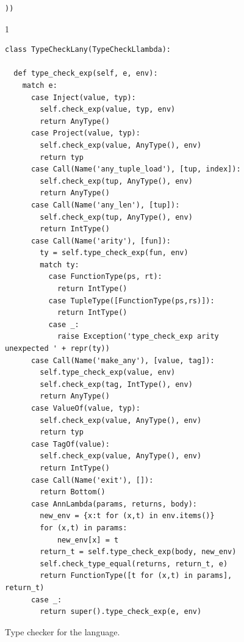 \documentclass[7x10,nocrop]{TimesAPriori_MIT}%
\def\pythonEd{1}
\def\edition{0}
\begin{document}
\begin{figure}[btp]
{\begin{lstlisting}[basicstyle=\ttfamily\small]
))
\end{lstlisting}
\fi}
{\if\edition\pythonEd
\begin{lstlisting}
class TypeCheckLany(TypeCheckLlambda):

  def type_check_exp(self, e, env):
    match e:
      case Inject(value, typ):
        self.check_exp(value, typ, env)
        return AnyType()
      case Project(value, typ):
        self.check_exp(value, AnyType(), env)
        return typ
      case Call(Name('any_tuple_load'), [tup, index]):
        self.check_exp(tup, AnyType(), env)
        return AnyType()
      case Call(Name('any_len'), [tup]):
        self.check_exp(tup, AnyType(), env)
        return IntType()
      case Call(Name('arity'), [fun]):
        ty = self.type_check_exp(fun, env)
        match ty:
          case FunctionType(ps, rt):
            return IntType()
          case TupleType([FunctionType(ps,rs)]):
            return IntType()
          case _:
            raise Exception('type_check_exp arity unexpected ' + repr(ty))
      case Call(Name('make_any'), [value, tag]):
        self.type_check_exp(value, env)
        self.check_exp(tag, IntType(), env)
        return AnyType()
      case ValueOf(value, typ):
        self.check_exp(value, AnyType(), env)
        return typ
      case TagOf(value):
        self.check_exp(value, AnyType(), env)
        return IntType()
      case Call(Name('exit'), []):
        return Bottom()
      case AnnLambda(params, returns, body):
        new_env = {x:t for (x,t) in env.items()}
        for (x,t) in params:
            new_env[x] = t
        return_t = self.type_check_exp(body, new_env)
        self.check_type_equal(returns, return_t, e)
        return FunctionType([t for (x,t) in params], return_t)
      case _:
        return super().type_check_exp(e, env)
\end{lstlisting}
\fi}
\caption{Type checker for the \LangAny{} language.}
\label{fig:type-check-Rany}
\end{figure}
\end{document}
